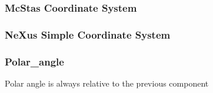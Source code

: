 \documentclass{beamer}
\begin{document}
\begin{frame} \frametitle{McStas Coordinate System }
\begin{figure}[!ht]
\end{figure}
\end{frame}



\begin{frame} \frametitle{NeXus Simple Coordinate System }
\begin{figure}[!ht]
\end{figure}
\end{frame}


\begin{frame} \frametitle{Polar\_angle }
Polar angle is always relative to the previous component 
\begin{figure}[!ht]
\end{figure}
\end{frame}
\end{document}
